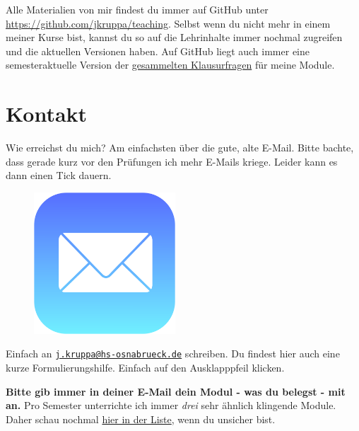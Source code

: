 \documentclass[
  letterpaper,
]{scrbook}
\begin{document}
Alle Materialien von mir findest du immer auf GitHub unter
\url{https://github.com/jkruppa/teaching}. Selbst wenn du nicht mehr in
einem meiner Kurse bist, kannst du so auf die Lehrinhalte immer nochmal
zugreifen und die aktuellen Versionen haben. Auf GitHub liegt auch immer
eine semesteraktuelle Version der
\href{https://github.com/jkruppa/teaching/tree/main/Klausur}{gesammelten
Klausurfragen} für meine Module.

\hypertarget{sec-contact-mail}{%
\section*{Kontakt}\label{sec-contact-mail}}

Wie erreichst du mich? Am einfachsten über die gute, alte E-Mail. Bitte
bachte, dass gerade kurz vor den Prüfungen ich mehr E-Mails kriege.
Leider kann es dann einen Tick dauern.

\begin{figure}

{\centering \includegraphics[width=2.08333in,height=\textheight]{./images/mail.png}

}

\end{figure}

Einfach an
\href{mailto:j.kruppa@hs-osnabrueck.de}{\nolinkurl{j.kruppa@hs-osnabrueck.de}}
schreiben. Du findest hier auch eine kurze Formulierungshilfe. Einfach
auf den Ausklapppfeil klicken.

\textbf{Bitte gib immer in deiner E-Mail dein Modul - was du belegst -
mit an.} Pro Semester unterrichte ich immer \emph{drei} sehr ähnlich
klingende Module. Daher schau nochmal
\protect\hyperlink{sec-vorlesungen-hs}{hier in der Liste}, wenn du
unsicher bist.
\end{document}
